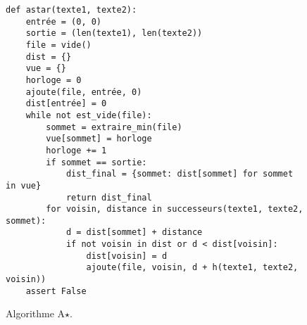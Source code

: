 \begin{figure}[H]
\begin{lstlisting}
def astar(texte1, texte2):
    entrée = (0, 0)
    sortie = (len(texte1), len(texte2))
    file = vide()
    dist = {}
    vue = {}
    horloge = 0
    ajoute(file, entrée, 0)
    dist[entrée] = 0
    while not est_vide(file):
        sommet = extraire_min(file)
        vue[sommet] = horloge
        horloge += 1
        if sommet == sortie:
            dist_final = {sommet: dist[sommet] for sommet in vue}
            return dist_final
        for voisin, distance in successeurs(texte1, texte2, sommet):
            d = dist[sommet] + distance
            if not voisin in dist or d < dist[voisin]:
                dist[voisin] = d
                ajoute(file, voisin, d + h(texte1, texte2, voisin))
    assert False
\end{lstlisting}
\caption{Algorithme A$\star$. \label{fig:06}}
\end{figure}

